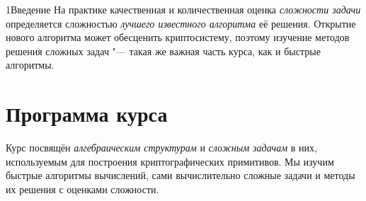 \begin{lecture}{1}{Введение}
На практике качественная и количественная оценка \emph{сложности задачи} определяется
сложностью \emph{лучшего известного алгоритма} её решения. Открытие нового алгоритма может
обесценить криптосистему, поэтому изучение методов решения сложных задач "--- такая же
важная часть курса, как и быстрые алгоритмы.



\section{Программа курса}

Курс посвящён \emph{алгебраическим структурам} и \emph{сложным задачам} в них, используемым
для построения криптографических примитивов. Мы изучим быстрые алгоритмы вычислений, сами
вычислительно сложные задачи и методы их решения с оценками сложности.


\end{lecture}
